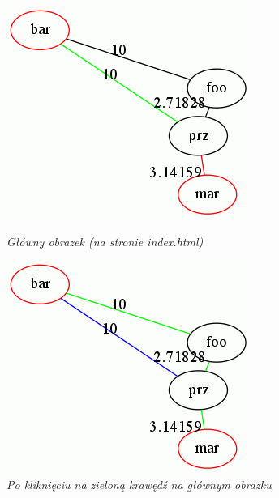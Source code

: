 \documentclass[a4paper, 12pt]{article}
\begin{document}
\begin{figure}[ht]
\begin{minipage}[b]{0.45\linewidth}
\centering
\includegraphics[width=\textwidth]{picture1.png}
\caption{\em Główny obrazek (na stronie index.html)}
\label{fig:picture1}
\end{minipage}
\hspace{0.5cm}
\begin{minipage}[b]{0.45\linewidth}
\centering
\includegraphics[width=\textwidth]{picture2.png}
\caption{\em Po kliknięciu na zieloną krawędź na głównym obrazku}
\label{fig:picture2}
\end{minipage}
\end{figure}
\end{document}
